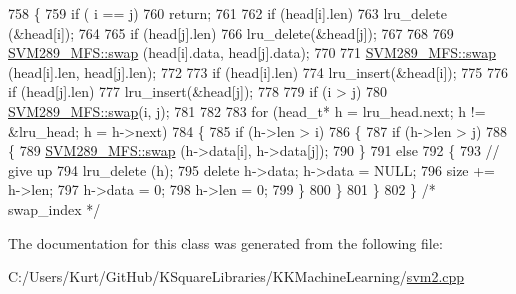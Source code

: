 \begin{DoxyCode}
758 \{
759   \textcolor{keywordflow}{if}  ( i == j) 
760     \textcolor{keywordflow}{return};
761 
762   \textcolor{keywordflow}{if}  (head[i].len) 
763     lru\_delete (&head[i]);
764 
765   \textcolor{keywordflow}{if}  (head[j].len) 
766     lru\_delete(&head[j]);
767 
768 
769   \hyperlink{namespace_s_v_m289___m_f_s_a195322b74181af0322d4e086a529c096}{SVM289\_MFS::swap} (head[i].data, head[j].data);
770 
771   \hyperlink{namespace_s_v_m289___m_f_s_a195322b74181af0322d4e086a529c096}{SVM289\_MFS::swap} (head[i].len,  head[j].len);
772 
773   \textcolor{keywordflow}{if}  (head[i].len) 
774     lru\_insert(&head[i]);
775 
776   \textcolor{keywordflow}{if}  (head[j].len) 
777     lru\_insert(&head[j]);
778 
779   \textcolor{keywordflow}{if}  (i > j) 
780     \hyperlink{namespace_s_v_m289___m_f_s_a195322b74181af0322d4e086a529c096}{SVM289\_MFS::swap}(i, j);
781 
782 
783   \textcolor{keywordflow}{for}  (head\_t*  h = lru\_head.next;  h != &lru\_head;  h = h->next)
784   \{
785     \textcolor{keywordflow}{if}  (h->len > i)
786     \{
787       \textcolor{keywordflow}{if}  (h->len > j)
788       \{
789         \hyperlink{namespace_s_v_m289___m_f_s_a195322b74181af0322d4e086a529c096}{SVM289\_MFS::swap} (h->data[i], h->data[j]);
790       \}
791       \textcolor{keywordflow}{else}
792       \{
793         \textcolor{comment}{// give up}
794         lru\_delete (h);
795         \textcolor{keyword}{delete} h->data;  h->data = NULL;
796         size += h->len;
797         h->data = 0;
798         h->len  = 0;
799       \} 
800     \}
801   \}
802 \}  \textcolor{comment}{/* swap\_index */}
\end{DoxyCode}


The documentation for this class was generated from the following file\+:\begin{DoxyCompactItemize}
\item 
C\+:/\+Users/\+Kurt/\+Git\+Hub/\+K\+Square\+Libraries/\+K\+K\+Machine\+Learning/\hyperlink{svm2_8cpp}{svm2.\+cpp}\end{DoxyCompactItemize}

